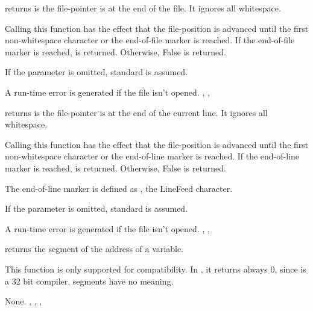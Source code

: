 \documentclass{report}
\begin{document}


{ returns  is the file-pointer is at the end of the
file. It ignores all whitespace.

Calling this function has the effect that the file-position is advanced
until the first non-whitespace character or the end-of-file marker is
reached.
If the end-of-file marker is reached,  is returned. Otherwise,
False is returned.

If the parameter  is omitted, standard  is assumed.
}
{A run-time error is generated if the file  isn't opened.}
{, , }



{ returns  is the file-pointer is at the end of the
current line. It ignores all whitespace.

Calling this function has the effect that the file-position is advanced
until the first non-whitespace character or the end-of-line marker is
reached.
If the end-of-line marker is reached,  is returned. Otherwise,
False is returned.

The end-of-line marker is defined as , the LineFeed character.

If the parameter  is omitted, standard  is assumed.}
{A run-time error is generated if the file  isn't opened.}
{, , }



{ returns the segment of the address of a variable. 

This function is only supported for compatibility. In \fpk, it 
returns always 0, since \fpk is a 32 bit compiler, segments have no meaning.
}
{None.}
{, , , }


\end{document}
